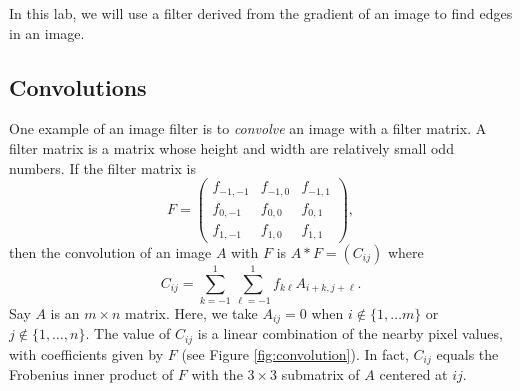 In this lab, we will use a filter derived from the gradient of an image to find edges in an image.

\subsection*{Convolutions} %

One example of an image filter is to \emph{convolve} an image with a filter matrix.
A filter matrix is a matrix whose height and width are relatively small odd numbers.
If the filter matrix is
\[
F = \begin{pmatrix}
f_{-1,-1}&f_{-1,0}&f_{-1,1}\\
f_{0,-1}&f_{0,0}&f_{0,1}\\
f_{1,-1}&f_{1,0}&f_{1,1}
\end{pmatrix},
\]
then the convolution of an image $A$ with $F$ is $A \ast F = (C_{ij})$ where
\begin{equation}\label{equ:convolve}
C_{ij} = \sum_{k=-1}^1 \sum_{\ell=-1}^1 f_{k\ell}A_{i+k,j+\ell}.
\end{equation}
Say $A$ is an $m \times n$ matrix. Here, we take $A_{ij}=0$ when $i \not \in \{1, \ldots m\}$ or $j \not \in \{1, \ldots, n\}$.
The value of $C_{ij}$ is a linear combination of the nearby pixel values, with coefficients given by $F$ (see Figure \ref{fig:convolution}).
In fact, $C_{ij}$ equals the Frobenius inner product of $F$ with the $3 \times 3$ submatrix of $A$ centered at $ij$.

